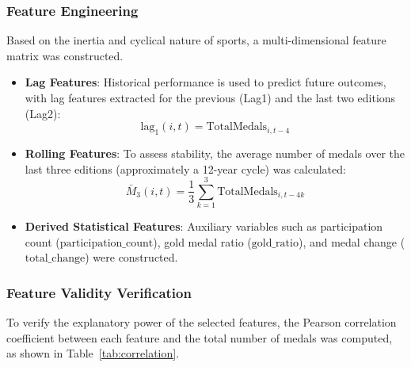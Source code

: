 \documentclass{mcmthesis}
\begin{document}
\subsubsection{Feature Engineering}

Based on the inertia and cyclical nature of sports, a multi-dimensional feature matrix was constructed.

\begin{itemize}
    \item \textbf{Lag Features}: Historical performance is used to predict future outcomes, with lag features extracted for the previous (Lag1) and the last two editions (Lag2):
    \[
    \text{lag}_1(i,t) = \text{TotalMedals}_{i,t-4}
    \]
    \item \textbf{Rolling Features}: To assess stability, the average number of medals over the last three editions (approximately a 12-year cycle) was calculated:
    \[
    \bar{M}_3(i,t) = \frac{1}{3}\sum_{k=1}^{3} \text{TotalMedals}_{i,t-4k}
    \]
    \item \textbf{Derived Statistical Features}: Auxiliary variables such as participation count ($\text{participation\_count}$), gold medal ratio ($\text{gold\_ratio}$), and medal change ($\text{total\_change}$) were constructed.
\end{itemize}

\subsubsection{Feature Validity Verification}

To verify the explanatory power of the selected features, the Pearson correlation coefficient between each feature and the total number of medals was computed, as shown in Table~\ref{tab:correlation}.

\begin{table}[htbp]
\centering
\caption{Correlation Analysis between Features and Total Medals}
\label{tab:correlation}
\end{table}
\end{document}
